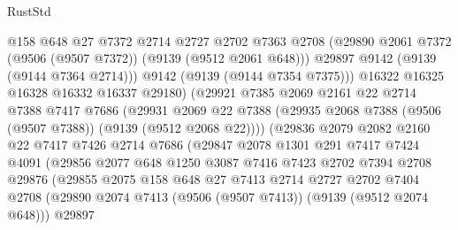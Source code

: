 \begin{lexlean}{RustStd}
\begin{coremodule}
                          @158
                          @648
                          @27
                          @7372
                          @2714
                          @2727
                          @2702
                          @7363
                          @2708
                          (@29890 @2061 @7372 (@9506 (@9507 @7372)) (@9139 (@9512 @2061 @648)))
                          @29897
                          @9142
                          (@9139 (@9144 @7364 @2714)))
                        @9142
                        (@9139 (@9144 @7354 @7375)))
                      @16322
                      @16325
                      @16328
                      @16332
                      @16337
                      @29180)
                    (@29921
                      @7385
                      @2069
                      @2161
                      @22
                      @2714
                      @7388
                      @7417
                      @7686
                      (@29931
                        @2069
                        @22
                        @7388
                        (@29935 @2068 @7388 (@9506 (@9507 @7388)) (@9139 (@9512 @2068 @22))))
                      (@29836
                        @2079
                        @2082
                        @2160
                        @22
                        @7417
                        @7426
                        @2714
                        @7686
                        (@29847
                          @2078
                          @1301
                          @291
                          @7417
                          @7424
                          @4091
                          (@29856
                            @2077
                            @648
                            @1250
                            @3087
                            @7416
                            @7423
                            @2702
                            @7394
                            @2708
                            @29876
                            (@29855
                              @2075
                              @158
                              @648
                              @27
                              @7413
                              @2714
                              @2727
                              @2702
                              @7404
                              @2708
                              (@29890 @2074 @7413 (@9506 (@9507 @7413)) (@9139 (@9512 @2074 @648)))
                              @29897

\end{coremodule}
\end{lexlean}

